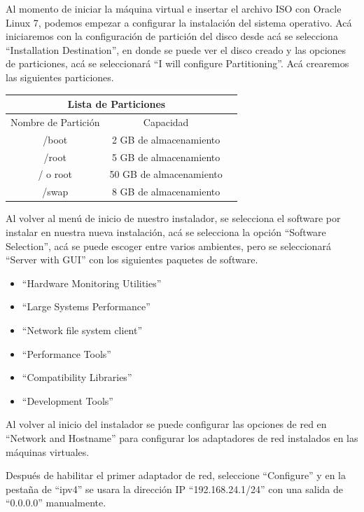 \documentclass{article}
\begin{document}
Al momento de iniciar la máquina virtual e insertar el archivo ISO con Oracle Linux 7, podemos empezar a configurar la instalación del sistema operativo. Acá iniciaremos con la configuración de partición del disco desde acá se selecciona ``Installation Destination'', en donde se puede ver el disco creado y las opciones de particiones, acá se seleccionará ``I will configure Partitioning''. Acá crearemos las siguientes particiones.

\begin{center}
	\begin{tabular}{ |c|c|c| }
		\hline
		\multicolumn{2}{|c|}{Lista de Particiones}    \\
		\hline
		Nombre de Partición & Capacidad               \\
		\hline
		/boot               & 2 GB de almacenamiento  \\
		/root               & 5 GB de almacenamiento  \\
		/ o root            & 50 GB de almacenamiento \\
		/swap               & 8 GB de almacenamiento  \\
		\hline
	\end{tabular}
\end{center}

Al volver al menú de inicio de nuestro instalador, se selecciona el software por instalar en nuestra nueva instalación, acá se selecciona la opción ``Software Selection'', acá se puede escoger entre varios ambientes, pero se seleccionará ``Server with GUI'' con los siguientes paquetes de software.

\begin{itemize}
	\item ``Hardware Monitoring Utilities''
	\item ``Large Systems Performance''
	\item ``Network file system client''
	\item ``Performance Tools''
	\item ``Compatibility Libraries''
	\item ``Development Tools''
\end{itemize}

Al volver al inicio del instalador se puede configurar las opciones de red en ``Network and Hostname'' para configurar los adaptadores de red instalados en las máquinas virtuales. 

Después de habilitar el primer adaptador de red, seleccione ``Configure'' y en la pestaña de ``ipv4'' se usara la dirección IP ``192.168.24.1/24'' con una salida de ``0.0.0.0''  manualmente.
\end{document}
